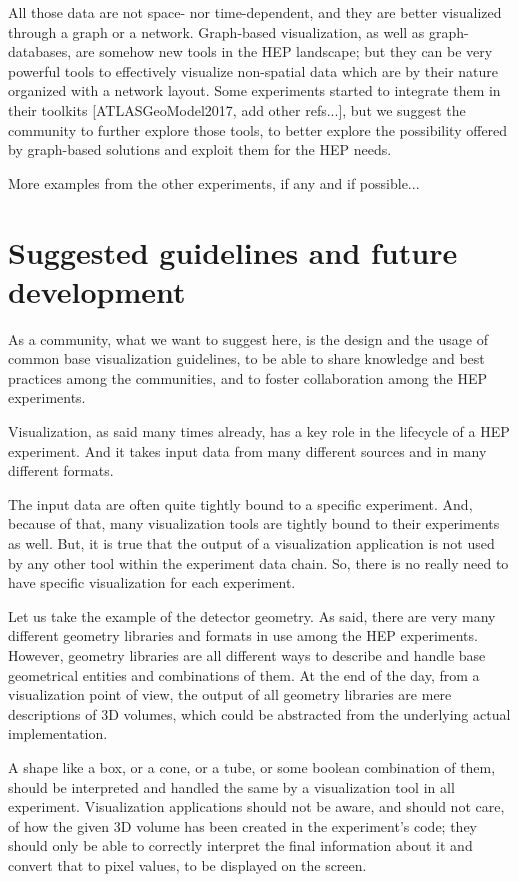 \documentclass[12pt,a4paper]{article}
\begin{document}
All those data are not space- nor time-dependent, and they are better visualized through a graph or a network. Graph-based visualization,
as well as graph-databases, are somehow new tools in the HEP landscape; but they can be very powerful tools to effectively visualize
non-spatial data which are by their nature organized with a network layout. Some experiments started to integrate them in their
toolkits [ATLASGeoModel2017, add other refs...], but we suggest the community to further explore those tools, to better explore the
possibility offered by graph-based solutions and exploit them for the HEP needs.

More examples from the other experiments, if any and if possible...

\hypertarget{suggested-guidelines}{%
\section{Suggested guidelines and future development}\label{suggested-guidelines}}

As a community, what we want to suggest here, is the design and the usage of common base visualization guidelines, to be able to share
knowledge and best practices among the communities, and to foster collaboration among the HEP experiments.

Visualization, as said many times already, has a key role in the lifecycle of a HEP experiment. And it takes input data from many
different sources and in many different formats.

The input data are often quite tightly bound to a specific experiment. And, because of that, many visualization tools are tightly
bound to their experiments as well. But, it is true that the output of a visualization application is not used by any other tool
within the experiment data chain. So, there is no really need to have specific visualization for each experiment.

Let us take the example of the detector geometry. As said, there are very many different geometry libraries and formats in
use among the HEP experiments. However, geometry libraries are all different ways to describe and handle base geometrical
entities and combinations of them. At the end of the day, from a visualization point of view, the output of all geometry
libraries are mere descriptions of 3D volumes, which  could be abstracted from the underlying actual implementation.

A shape like a box, or a cone, or a tube, or some boolean combination of them, should be interpreted and handled the same by a
visualization tool in all experiment. Visualization applications should not be aware, and should not care, of how  the given 3D
volume has been created in the experiment’s code; they should only be able to correctly interpret the final information about it
and convert that to pixel values, to be displayed on the screen.
\end{document}
